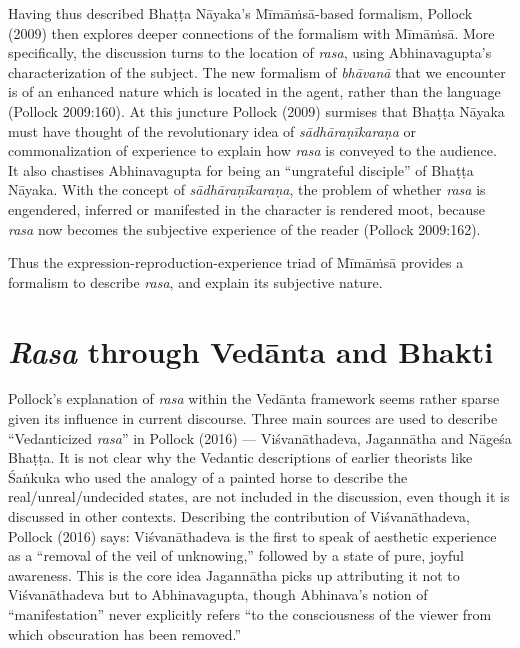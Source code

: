 Having thus described Bhaṭṭa Nāyaka’s Mīmāṁsā-based formalism, Pollock (2009) then explores deeper connections of the formalism with Mīmāṁsā. More specifically, the discussion turns to the location of \textsl{rasa}, using Abhinavagupta’s characterization of the subject. The new formalism of \textsl{bhāvanā} that we encounter is of an enhanced nature which is located in the agent, rather than the language (Pollock 2009:160). At this juncture Pollock (2009) surmises that Bhaṭṭa Nāyaka must have thought of the revolutionary idea of \textsl{sādhāraṇīkaraṇa} or commonalization of experience to explain how \textsl{rasa} is conveyed to the audience. It also chastises Abhinavagupta for being an “ungrateful disciple” of Bhaṭṭa Nāyaka. With the concept of \textsl{sādhāraṇīkaraṇa}, the problem of whether \textsl{rasa} is engendered, inferred or manifested in the character is rendered moot, because \textsl{rasa} now becomes the subjective experience of the reader (Pollock 2009:162).

Thus the expression-reproduction-experience triad of Mīmāṁsā provides a formalism to describe \textsl{rasa}, and explain its subjective nature.\\[-20pt] 

\section*{\textsl{Rasa} through Vedānta and Bhakti}

Pollock’s explanation of \textsl{rasa} within the Vedānta framework seems rather sparse given its influence in current discourse. Three main sources are used to describe “Vedanticized \textsl{rasa}” in Pollock (2016) --- Viśvanāthadeva, Jagannātha and Nāgeśa Bhaṭṭa. It is not clear why the Vedantic descriptions of earlier theorists like Śaṅkuka who used the analogy of a painted horse to describe the real/unreal/undecided states, are not included in the discussion, even though it is discussed in other contexts. Describing the contribution of Viśvanāthadeva, Pollock (2016) says: Viśvanāthadeva is the first to speak of aesthetic experience as a “removal of the veil of unknowing,” followed by a state of pure, joyful awareness. This is the core idea Jagannātha picks up attributing it not to Viśvanāthadeva but to Abhinavagupta, though Abhinava’s notion of “manifestation” never explicitly refers “to the consciousness of the viewer from which obscuration has been removed.”

